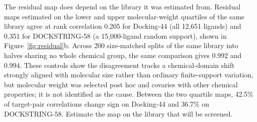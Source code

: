 The residual map does depend on the library it was estimated from. Residual maps estimated on
the lower and upper molecular-weight quartiles of the same library agree at rank correlation
0.205 for Docking-44 (all 12{,}651 ligands) and 0.351 for DOCKSTRING-58 (a 15{,}000-ligand
random support), shown in Figure~\ref{fig:residual}b. Across 200 size-matched splits of the
same library into halves sharing no whole chemical group, the same comparison gives 0.992 and
0.994. These controls show the disagreement tracks a chemical-domain shift strongly aligned with
molecular size rather than ordinary finite-support variation, but
molecular weight was selected post hoc and covaries with other chemical properties; it is not
identified as the cause. Between the two quartile maps, 42.5\% of target-pair correlations
change sign on Docking-44 and 36.7\% on DOCKSTRING-58. Estimate the map on the library that
will be screened.
